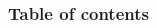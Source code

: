 




%
\frame{\titlepage}
%
\begin{frame}
\frametitle{Table of contents}
\begin{multicols}{2}
\tableofcontents[currentsection]
\end{multicols}
\end{frame}
%

%
%

%

